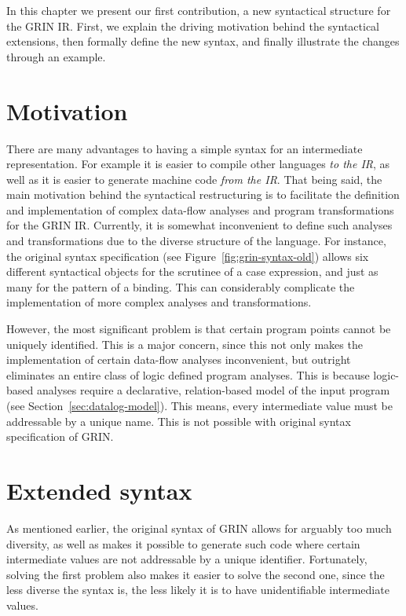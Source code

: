 \documentclass[main.tex]{subfiles}
\begin{document}
  In this chapter we present our first contribution, a new syntactical structure for the GRIN IR. First, we explain the driving motivation behind the syntactical extensions, then formally define the new syntax, and finally illustrate the changes through an example.

  \section{Motivation}

  There are many advantages to having a simple syntax for an intermediate representation. For example it is easier to compile other languages \emph{to the IR}, as well as it is easier to generate machine code \emph{from the IR}.
  That being said, the main motivation behind the syntactical restructuring is to facilitate the definition and implementation of complex data-flow analyses and program transformations for the GRIN IR. Currently, it is somewhat inconvenient to define such analyses and transformations due to the diverse structure of the language. For instance, the original syntax specification (see Figure~\ref{fig:grin-syntax-old}) allows six different syntactical objects for the scrutinee of a case expression, and just as many for the pattern of a binding. This can considerably complicate the implementation of more complex analyses and transformations.

  However, the most significant problem is that certain program points cannot be uniquely identified. This is a major concern, since this not only makes the implementation of certain data-flow analyses inconvenient, but outright eliminates an entire class of logic defined program analyses. This is because logic-based analyses require a declarative, relation-based model of the input program (see Section~\ref{sec:datalog-model}). This means, every intermediate value must be addressable by a unique name. This is not possible with original syntax specification of GRIN.

  \section{Extended syntax}

  As mentioned earlier, the original syntax of GRIN allows for arguably too much diversity, as well as makes it possible to generate such code where certain intermediate values are not addressable by a unique identifier. Fortunately, solving the first problem also makes it easier to solve the second one, since the less diverse the syntax is, the less likely it is to have unidentifiable intermediate values.
\end{document}
